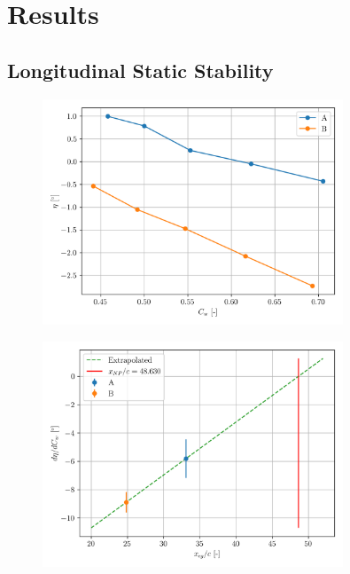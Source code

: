 \documentclass{article}
\begin{document}
\title{}
\author{lwp26}
\date{January 2025}
\maketitle


\section{Results}

\subsection{Longitudinal Static Stability}

\begin{figure}[H]
    \centering
    \includegraphics[width=0.8\textwidth]{Longitudinal_Static_Stability_1.png}
    \caption{}
    \label{fig:Longitudinal_Static_Stability_1}
\end{figure}
\begin{figure}[H]
    \centering
    \includegraphics[width=0.8\textwidth]{Longitudinal_Static_Stability_2.png}
    \caption{}
    \label{fig:Longitudinal_Static_Stability_2}
\end{figure}
\end{document}
